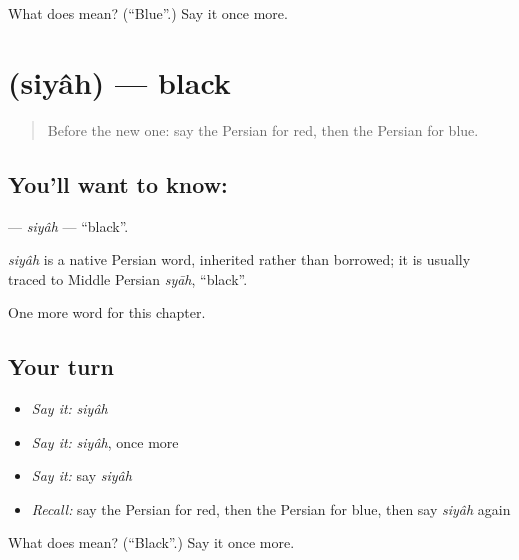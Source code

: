 \begin{tcolorbox}[breakable,colback=teal!4,colframe=teal!35!black,title={Before you move on}]
What does  mean? (\textquotedblleft{}Blue\textquotedblright{}.) Say it once more.
\end{tcolorbox}
\section[\texorpdfstring{\fa{سیاه} (siyâh)}{سیاه (siyâh)}]{ (siyâh) — black}

\label{lesson:FA-C64-siyah}



\begin{quote}
Before the new one: say the Persian for red, then the Persian for blue.
\end{quote}

\subsection*{You'll want to know: }
\textbf{} — \emph{siyâh} — \textquotedblleft{}black\textquotedblright{}.

\begin{cousinweb}
\emph{siyâh} is a native Persian word, inherited rather than borrowed; it is usually traced to Middle Persian \emph{syāh}, \textquotedblleft{}black\textquotedblright{}.
\end{cousinweb}

\begin{grammarlens}[title={What you've built}]
One more word for this chapter.
\end{grammarlens}

\subsection*{Your turn}
\begin{itemize}
\raggedright
  \item \emph{Say it:} \emph{siyâh}
  \item \emph{Say it:} \emph{siyâh}, once more
  \item \emph{Say it:} say \emph{siyâh}
  \item \emph{Recall:} say the Persian for red, then the Persian for blue, then say \emph{siyâh} again
\end{itemize}

\begin{tcolorbox}[breakable,colback=teal!4,colframe=teal!35!black,title={Before you move on}]
What does  mean? (\textquotedblleft{}Black\textquotedblright{}.) Say it once more.
\end{tcolorbox}
